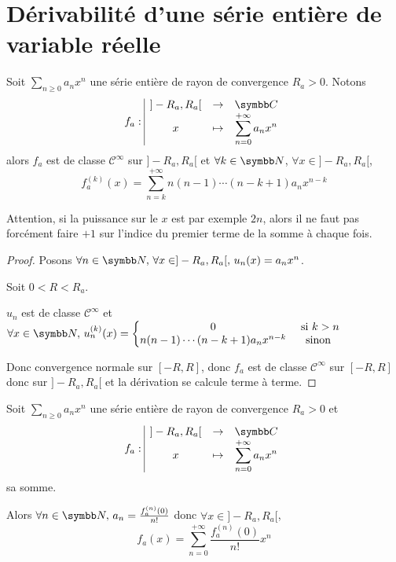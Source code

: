 \section{Dérivabilité d'une série entière de variable réelle}


\begin{theoreme}{}{}
    Soit $\sum_{n \geqslant 0} a_n x^n$ une série entière de rayon de convergence $R_a > 0$.
    Notons \[\fonction{f_a}{]-R_a, R_a[}{\C}{x}{\sum_{n = 0}^{+\infty} a_n x^n}\] alors 
    $f_a$ est de classe $\mathscr {C}^\infty$ sur $]-R_a, R_a[$ et 
    $\forall k \in \N$, $\forall x \in ]-R_a, R_a[$,
    \[f^{(k)}_a(x) = \sum_{n = k}^{+\infty} n (n - 1) \cdots (n - k + 1) a_n x^{n - k}\]
\end{theoreme}


\begin{remarque}
    Attention, si la puissance sur le $x$ est par exemple $2n$, alors il ne faut pas forcément 
    faire $+1$ sur l'indice du premier terme de la somme à chaque fois. 
\end{remarque}

\begin{proof}
    Posons $\forall n \in \N, \, \forall x \in ]-R_a, R_a[, \, u_n(x) = a_n x^n$.

    Soit $0 < R < R_a$. 

    $u_n $ est de classe $\mathscr {C}^\infty$ et $\forall x \in \N, \, u_n^{(k)}(x) = \left\{ \begin{matrix}
        0 & \text{ si } k > n \\
        n(n- 1) \cdots (n - k + 1) a_n x^{n - k} & \text{ sinon }
    \end{matrix} \right.$ 

    Donc convergence normale sur $[-R, R]$, donc $f_a$ est de classe $\mathscr {C}^\infty$ 
    sur $[-R, R]$ donc sur $]-R_a, R_a[$ et la dérivation se calcule terme à terme.
\end{proof}

\begin{corollaire}{}{}
    Soit $\sum_{n \geqslant 0} a_n x^n$ une série entière de rayon de convergence $R_a > 0$ 
    et \[\fonction{f_a}{]-R_a, R_a[}{\C}{x}{\sum_{n = 0}^{+\infty} a_n x^n}\] sa somme. 

    Alors $\forall n \in \N, \, a_n = \frac{f_a^{(n)}(0)}{n!}$ donc 
    $\forall x \in ]-R_a, R_a[$, 
    \[f_a(x) = \sum_{n = 0}^{+\infty} \frac{f_a^{(n)}(0)}{n!} x^n\]
\end{corollaire}

